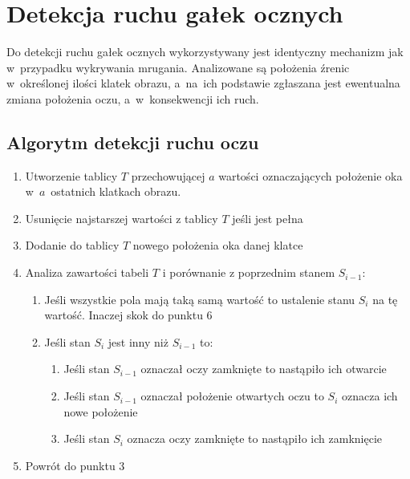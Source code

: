 \newpage

\section{Detekcja ruchu gałek ocznych}

Do detekcji ruchu gałek ocznych wykorzystywany jest identyczny mechanizm jak w~przypadku wykrywania mrugania. Analizowane są położenia źrenic w~określonej ilości klatek obrazu, a~na~ich podstawie zgłaszana jest ewentualna zmiana położenia oczu, a~w~konsekwencji ich ruch. 

\subsection{Algorytm detekcji ruchu oczu}

\begin{enumerate}
    \item Utworzenie tablicy $T$ przechowującej $a$ wartości oznaczających położenie oka w~$a$~ostatnich klatkach obrazu.
    \item Usunięcie najstarszej wartości z tablicy $T$ jeśli jest pełna
    \item Dodanie do tablicy $T$ nowego położenia oka danej klatce
    \item Analiza zawartości tabeli $T$  i porównanie z poprzednim stanem $S_{i-1}$:
    
    \begin{enumerate}
        \item Jeśli wszystkie pola mają taką samą wartość to ustalenie stanu $S_{i}$ na tę wartość. Inaczej skok do punktu 6
        \item Jeśli stan $S_{i}$ jest inny niż $S_{i-1}$ to:
        
        \begin{enumerate}
            \item Jeśli stan $S_{i-1}$ oznaczał oczy zamknięte to nastąpiło ich otwarcie
            \item Jeśli stan $S_{i-1}$ oznaczał położenie otwartych oczu to $S_{i}$ oznacza ich nowe położenie 
            \item Jeśli stan $S_{i}$ oznacza oczy zamknięte to nastąpiło ich zamknięcie
        \end{enumerate}
    \end{enumerate}
    
    \item Powrót do punktu 3
\end{enumerate}

